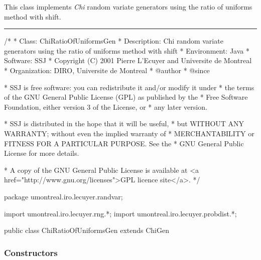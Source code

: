 
This class implements {\em Chi\/} random variate generators using
 the ratio of uniforms method with shift.


\bigskip\hrule

\begin{code}
\begin{hide}
/*
 * Class:        ChiRatioOfUniformsGen
 * Description:  Chi random variate generators using the ratio of uniforms
                 method with shift
 * Environment:  Java
 * Software:     SSJ 
 * Copyright (C) 2001  Pierre L'Ecuyer and Universite de Montreal
 * Organization: DIRO, Universite de Montreal
 * @author       
 * @since

 * SSJ is free software: you can redistribute it and/or modify it under
 * the terms of the GNU General Public License (GPL) as published by the
 * Free Software Foundation, either version 3 of the License, or
 * any later version.

 * SSJ is distributed in the hope that it will be useful,
 * but WITHOUT ANY WARRANTY; without even the implied warranty of
 * MERCHANTABILITY or FITNESS FOR A PARTICULAR PURPOSE.  See the
 * GNU General Public License for more details.

 * A copy of the GNU General Public License is available at
   <a href="http://www.gnu.org/licenses">GPL licence site</a>.
 */
\end{hide}
package umontreal.iro.lecuyer.randvar;\begin{hide}
import umontreal.iro.lecuyer.rng.*;
import umontreal.iro.lecuyer.probdist.*;
\end{hide}

public class ChiRatioOfUniformsGen extends ChiGen \begin{hide} {

\end{hide}
\end{code}

\subsubsection* {Constructors}


